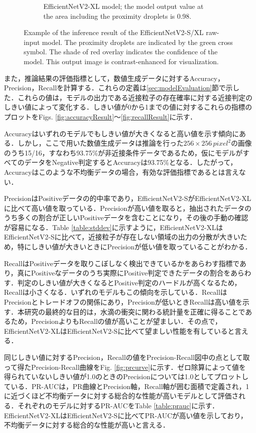 \begin{figure}[H]
\begin{subfigure}[t]{0.85\linewidth}
        \caption{EfficientNetV2-XL model; the model output value at the area including the proximity droplets is \num{0.98}. }
        \label{fig:numericalInfResult:xl}
    \end{subfigure}

    \caption{Example of the inference result of the EfficientNetV2-S/XL raw-input model. The proximity droplets are indicated by the green cross symbol. The shade of red overlay indicates the confidence of the model. This output image is contrast-enhanced for visualization.} 
    \label{fig:numericalInfResult}
\end{figure}

また，推論結果の評価指標として，数値生成データに対するAccuracy，Precision，Recallを計算する．これらの定義は\ref{sec:modelEvaluation}節で示した．これらの値は，モデルの出力である近接粒子の存在確率に対する近接判定のしきい値によって変化する．しきい値が0から1までの値に対するこれらの指標のプロットをFigs. \ref{fig:accuracyResult}〜\ref{fig:recallResult}に示す．

Accuracyはいずれのモデルでもしきい値が大きくなると高い値を示す傾向にある．しかし，ここで用いた数値生成データは推論を行った$256 \times 256 \,\si{pixel^2}$の画像のうち15/16，すなわち93.75\%が非近接条件データであるため，仮にモデルがすべてのデータをNegative判定するとAccuracyは93.75\%となる．したがって，Accuracyはこのような不均衡データの場合，有効な評価指標であるとは言えない．

PrecisionはPositiveデータの的中率であり，EfficientNetV2-SがEfficientNetV2-XLに比べて高い値を取っている．Precisionが高い値を取ると，抽出されたデータのうち多くの割合が正しいPositiveデータを含むことになり，その後の手動の確認が容易になる．Table \ref{table:stddev}に示すように，EfficientNetV2-XLはEfficientNetV2-Sに比べて，近接粒子が存在しない領域の出力の分散が大きいため，特にしきい値が大きいときにPrecisionが低い値を取っていることがわかる．

RecallはPositiveデータを取りこぼしなく検出できているかをあらわす指標であり，真にPositiveなデータのうち実際にPositive判定できたデータの割合をあらわす．判定のしきい値が大きくなるとPositive判定のハードルが高くなるため，Recallは小さくなる．いずれのモデルもこの傾向を示している．RecallはPrecisionとトレードオフの関係にあり\cite{saito2015}，Precisionが低いときRecallは高い値を示す．本研究の最終的な目的は，水滴の衝突に関わる統計量を正確に得ることであるため，PrecisionよりもRecallの値が高いことが望ましい．その点で，EfficientNetV2-XLはEfficientNetV2-Sに比べて望ましい性能を有していると言える．

同じしきい値に対するPrecision，Recallの値をPrecision-Recall図中の点として取って得たPrecision-Recall曲線をFig. \ref{fig:prcurve}に示す．ゼロ除算によって値を得られていないしきい値が1.0のときのPrecisionについては1.0としてプロットしている．PR-AUCは，PR曲線とPrecision軸，Recall軸が囲む面積で定義され，1に近づくほど不均衡データに対する総合的な性能が高いモデルとして評価される\cite{saito2015}．それぞれのモデルに対するPR-AUCをTable \ref{table:prauc}に示す．EfficientNetV2-XLはEfficientNetV2-Sに比べてPR-AUCが高い値を示しており，不均衡データに対する総合的な性能が高いと言える．

